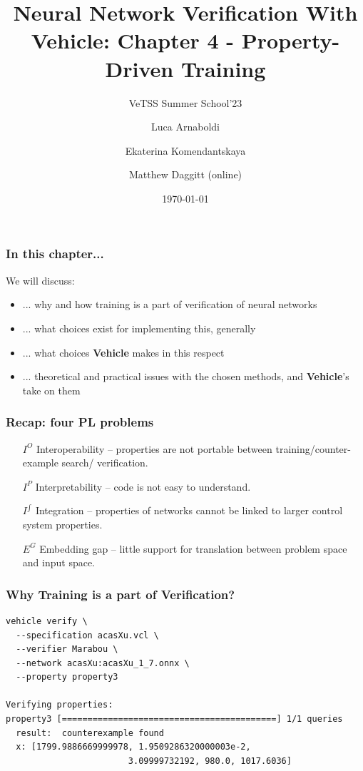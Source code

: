 \documentclass[t,compress,aspectratio=169]{beamer}
\title{Neural Network Verification With Vehicle: Chapter 4 -  Property-Driven Training}
\subtitle{VeTSS Summer School'23}  %
\date{\today}
\author{Luca Arnaboldi\inst{1}  \and Ekaterina Komendantskaya\inst{2} \and Matthew Daggitt (online) \inst{3}}
\institute{$^{1}$University of Birmingham $\cdot$ $^{2}$University of Southampton $\cdot$ $^{3}$Heriot-Watt University}
\begin{document}

\setbackground
\begin{frame} %
  \titlepage
\end{frame}
\unsetbackground


\begin{frame}
\frametitle{In this chapter...}

We will discuss:

\begin{itemize}[<+->]
\item  ...  why and how training is a part of verification of neural networks
\item ... what choices exist for implementing this, generally
\item ... what choices \textbf{Vehicle} makes in this respect
\item ... theoretical and practical issues with the chosen methods, and \textbf{Vehicle}'s
take on them
\end{itemize}

\end{frame}


\begin{frame}
\frametitle{Recap: four PL problems}

\begin{itemize}
\item[$I^O$] \alert{Interoperability -- properties are not portable between training/counter-example search/ verification.}

\item[$I^{P}$] Interpretability -- code is not easy to understand.

\item[$I^{\int}$] Integration -- properties of networks cannot be linked to larger control system properties.

\item[$E^G$] Embedding gap -- little support for translation between problem space and input space.
\end{itemize}
\end{frame}


    \begin{frame}[fragile]
\frametitle{Why Training is a part of Verification?}

\begin{verbatim}
vehicle verify \
  --specification acasXu.vcl \
  --verifier Marabou \
  --network acasXu:acasXu_1_7.onnx \
  --property property3

Verifying properties:
property3 [==========================================] 1/1 queries
  result:  counterexample found
  x: [1799.9886669999978, 1.9509286320000003e-2,
                        3.09999732192, 980.0, 1017.6036]
\end{verbatim}

\end{frame}
\end{document}
